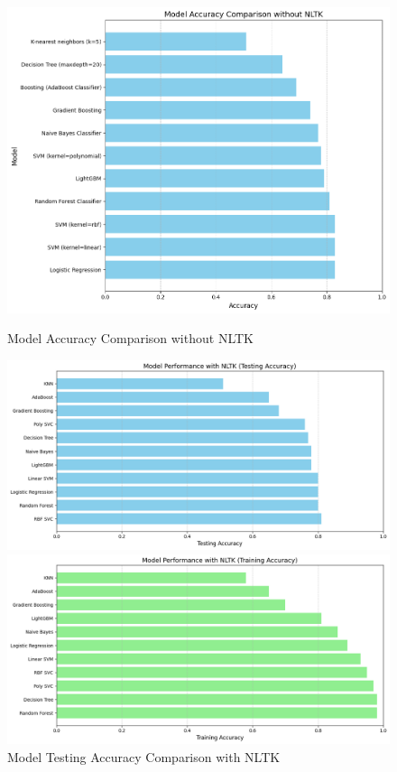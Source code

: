 \documentclass[a4paper]{article}
\theoremstyle{plain}
\theoremstyle{definition}
\begin{document}
\begin{figure}[htbp]
    \centering
    \begin{minipage}[b]{0.3\textwidth}
        \centering
        \includegraphics[width=\textwidth]{figs/download (2).png}
        \caption*{Model Accuracy Comparison without NLTK}
        \label{fig:figure3}
    \end{minipage}
    \hfill
    \begin{minipage}[b]{0.3\textwidth}
        \centering
        \includegraphics[width=\textwidth]{figs/download (3).png}
        \caption*{Model Testing Accuracy Comparison with NLTK}
        \label{fig:figure4}
    \end{minipage}
    \hfill
    \begin{minipage}[b]{0.3\textwidth}
        \centering
        \includegraphics[width=\textwidth]{figs/download (4).png}

\end{minipage}
\end{figure}
\end{document}
